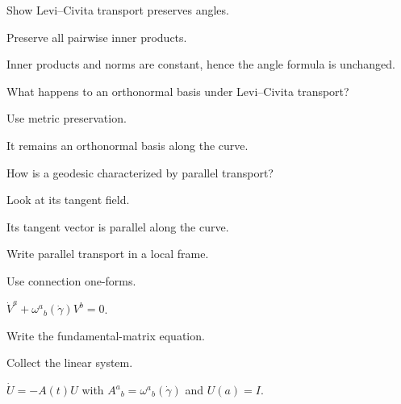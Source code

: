 \begin{exercise}\label{exr:vii24-09}
Show Levi--Civita transport preserves angles.
\end{exercise}
\begin{hint}
Preserve all pairwise inner products.
\end{hint}
\begin{solution}
Inner products and norms are constant, hence the angle formula is unchanged.
\end{solution}


\begin{exercise}\label{exr:vii24-10}
What happens to an orthonormal basis under Levi--Civita transport?
\end{exercise}
\begin{hint}
Use metric preservation.
\end{hint}
\begin{solution}
It remains an orthonormal basis along the curve.
\end{solution}


\begin{exercise}\label{exr:vii24-11}
How is a geodesic characterized by parallel transport?
\end{exercise}
\begin{hint}
Look at its tangent field.
\end{hint}
\begin{solution}
Its tangent vector is parallel along the curve.
\end{solution}


\begin{exercise}\label{exr:vii24-12}
Write parallel transport in a local frame.
\end{exercise}
\begin{hint}
Use connection one-forms.
\end{hint}
\begin{solution}
\(\dot V^a+\omega^a{}_b(\dot\gamma)V^b=0\).
\end{solution}


\begin{exercise}\label{exr:vii24-13}
Write the fundamental-matrix equation.
\end{exercise}
\begin{hint}
Collect the linear system.
\end{hint}
\begin{solution}
\(\dot U=-A(t)U\) with \(A^a{}_b=\omega^a{}_b(\dot\gamma)\) and \(U(a)=I\).
\end{solution}


